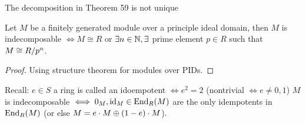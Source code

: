 \documentclass[a4paper]{report}
\begin{document}
\begin{rem*}
The decomposition in Theorem 59 is not unique
\end{rem*}
\begin{exer*}
  Let $M$ be a finitely generated module over a principle ideal domain, then $M$ is indecomposable $\iff M \cong R$ or $\exists n \in \mathbb{N}, \exists$ prime element $p \in R$ such that $M \cong \fak R{p^{n}}$.
  \begin{proof}Using structure theorem for modules over PIDs.
  \end{proof}
\end{exer*}

\begin{rem*}[Exercise]
  Recall: $e \in S$ a ring is called an idoempotent $\iff e^{2} = 2$ (nontrivial $\iff e \ne 0, 1$)
  $M$ is indecomposable $\iff 0_{M}, \operatorname{id}_{M} \in \operatorname{End}_{R}(M)$ are the only idempotents in $\operatorname{End}_{R}(M)$ (or else $M = e\cdot M \oplus (1-e)\cdot M$).
\end{rem*}
\end{document}
